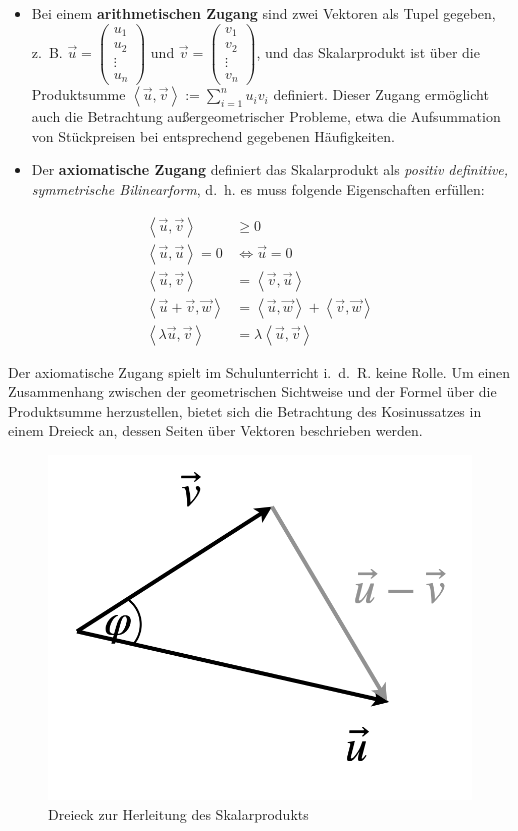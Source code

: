 \documentclass[
]{scrbook}
\theoremstyle{definition}
\theoremstyle{definition}
\theoremstyle{definition}
\theoremstyle{definition}
\theoremstyle{remark}
\begin{document}
\begin{itemize}
\item
  Bei einem \textbf{arithmetischen Zugang} sind zwei Vektoren als Tupel gegeben, z.~B. \(\vec u = \left(\begin{array}{c} u_1 \\ u_2\\\vdots \\ u_n \end{array}\right)\) und \(\vec v = \left(\begin{array}{c} v_1 \\ v_2\\\vdots \\ v_n \end{array}\right)\), und das Skalarprodukt ist über die Produktsumme \(\left<\vec u, \vec v\right> := \sum\limits_{i=1}^n u_iv_i\) definiert. Dieser Zugang ermöglicht auch die Betrachtung außergeometrischer Probleme, etwa die Aufsummation von Stückpreisen bei entsprechend gegebenen Häufigkeiten.
\item
  Der \textbf{axiomatische Zugang} definiert das Skalarprodukt als \emph{positiv definitive, symmetrische Bilinearform}, d.~h. es muss folgende Eigenschaften erfüllen:
\end{itemize}

\begin{align*} \left<\vec u, \vec v \right> &\geq 0\\\left<\vec u,\vec u\right> = 0 &\Leftrightarrow \vec u = 0 \\ \left<\vec u,\vec v\right> &= \left<\vec v,\vec u\right>\\ \left<\vec u+\vec v,\vec w\right> &= \left<\vec u,\vec w\right> + \left<\vec v,\vec w\right>\\ \left<\lambda \vec  u,\vec v\right> &= \lambda \left<\vec u,\vec v\right> \end{align*}

Der axiomatische Zugang spielt im Schulunterricht i.~d.~R. keine Rolle. Um einen Zusammenhang zwischen der geometrischen Sichtweise und der Formel über die Produktsumme herzustellen, bietet sich die Betrachtung des Kosinussatzes in einem Dreieck an, dessen Seiten über Vektoren beschrieben werden.

\begin{figure}

{\centering \includegraphics[width=0.5\linewidth]{pictures/11-Dreieck} 

}

\caption{Dreieck zur Herleitung des Skalarprodukts}\label{fig:Dreieck}
\end{figure}
\end{document}
